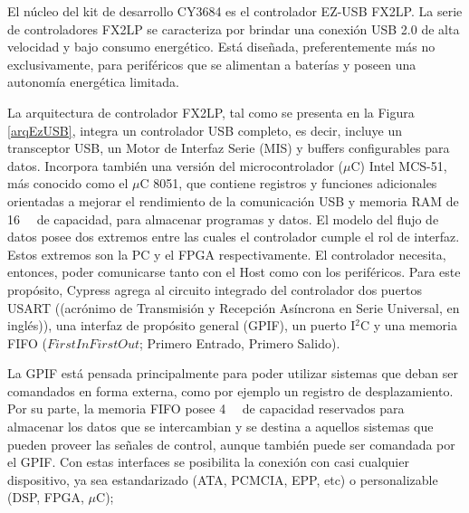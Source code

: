 El núcleo del kit de desarrollo CY3684 es el controlador EZ-USB FX2LP. La serie de controladores FX2LP se caracteriza por brindar una conexión USB 2.0 de alta velocidad y bajo consumo energético. Está diseñada, preferentemente más no exclusivamente, para periféricos que se alimentan a baterías y poseen una autonomía energética limitada.

La arquitectura de controlador FX2LP, tal como se presenta en la Figura \ref{arqEzUSB}, integra un controlador USB completo, es decir, incluye un transceptor USB, un Motor de Interfaz Serie (MIS) y buffers configurables para datos. Incorpora también una versión del microcontrolador ($\mu$C) Intel MCS-51, más conocido como el $\mu$C 8051, que contiene registros y funciones adicionales orientadas a mejorar el rendimiento de la comunicación USB y memoria RAM de \SI{16}{\kilo\byte} de capacidad, para almacenar programas y datos. 
El modelo del flujo de datos posee dos extremos entre las cuales el controlador cumple el rol de interfaz. Estos extremos son la PC y el FPGA respectivamente. El controlador necesita, entonces, poder comunicarse tanto con el Host como con los periféricos. Para este propósito, Cypress agrega al circuito integrado del controlador dos puertos USART ((acrónimo de Transmisión y Recepción Asíncrona en Serie Universal, en inglés)), una interfaz de propósito general (GPIF), un puerto I$^2$C y una memoria FIFO (\(First In First Out\); Primero Entrado, Primero Salido).

La GPIF está pensada principalmente para poder utilizar sistemas que deban ser comandados en forma externa, como por ejemplo un registro de desplazamiento. Por su parte, la memoria FIFO posee \SI{4}{\kilo\byte} de capacidad reservados para almacenar los datos que se intercambian y se destina a aquellos sistemas que pueden proveer las señales de control, aunque también puede ser comandada por el GPIF. Con estas interfaces se posibilita la conexión con casi cualquier dispositivo, ya sea estandarizado (ATA, PCMCIA, EPP, etc) o personalizable (DSP, FPGA, $\mu$C);

